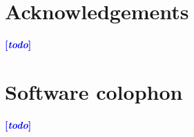 \documentclass[a4paper,fleqn]{cas-dc}
\newcommand{\tb}[1]{\textcolor{blue}{#1}}
\newcommand{\rk}[1]{\tb{{\footnotesize {\bf[\emph{#1}]}}}}
\begin{document}







\printcredits

\section*{Acknowledgements}
\rk{todo}

\section*{Software colophon}
\rk{todo}




\end{document}
